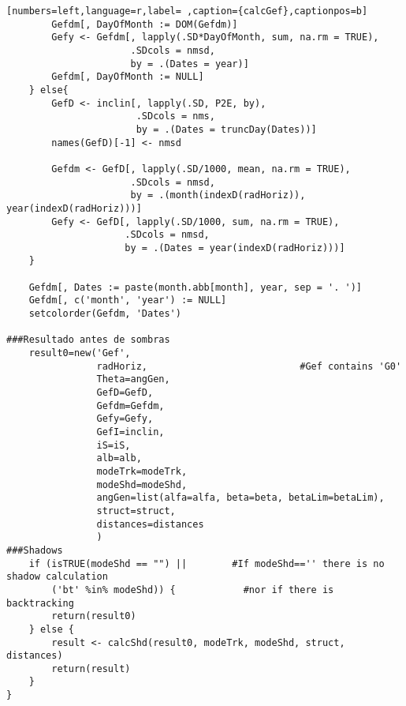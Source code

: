 \begin{lstlisting}[numbers=left,language=r,label= ,caption={calcGef},captionpos=b]
        Gefdm[, DayOfMonth := DOM(Gefdm)]
        Gefy <- Gefdm[, lapply(.SD*DayOfMonth, sum, na.rm = TRUE),
                      .SDcols = nmsd,
                      by = .(Dates = year)]
        Gefdm[, DayOfMonth := NULL]
    } else{
        GefD <- inclin[, lapply(.SD, P2E, by),
                       .SDcols = nms,
                       by = .(Dates = truncDay(Dates))]
        names(GefD)[-1] <- nmsd

        Gefdm <- GefD[, lapply(.SD/1000, mean, na.rm = TRUE),
                      .SDcols = nmsd,
                      by = .(month(indexD(radHoriz)), year(indexD(radHoriz)))]
        Gefy <- GefD[, lapply(.SD/1000, sum, na.rm = TRUE),
                     .SDcols = nmsd,
                     by = .(Dates = year(indexD(radHoriz)))]
    }

    Gefdm[, Dates := paste(month.abb[month], year, sep = '. ')]
    Gefdm[, c('month', 'year') := NULL]
    setcolorder(Gefdm, 'Dates')

###Resultado antes de sombras
    result0=new('Gef',
                radHoriz,                           #Gef contains 'G0'
                Theta=angGen,
                GefD=GefD,
                Gefdm=Gefdm,
                Gefy=Gefy,
                GefI=inclin,
                iS=iS,
                alb=alb,
                modeTrk=modeTrk,
                modeShd=modeShd,
                angGen=list(alfa=alfa, beta=beta, betaLim=betaLim),
                struct=struct,
                distances=distances
                )
###Shadows
    if (isTRUE(modeShd == "") ||        #If modeShd=='' there is no shadow calculation
        ('bt' %in% modeShd)) {            #nor if there is backtracking
        return(result0)
    } else {
        result <- calcShd(result0, modeTrk, modeShd, struct, distances)
        return(result)
    }
}
\end{lstlisting}
